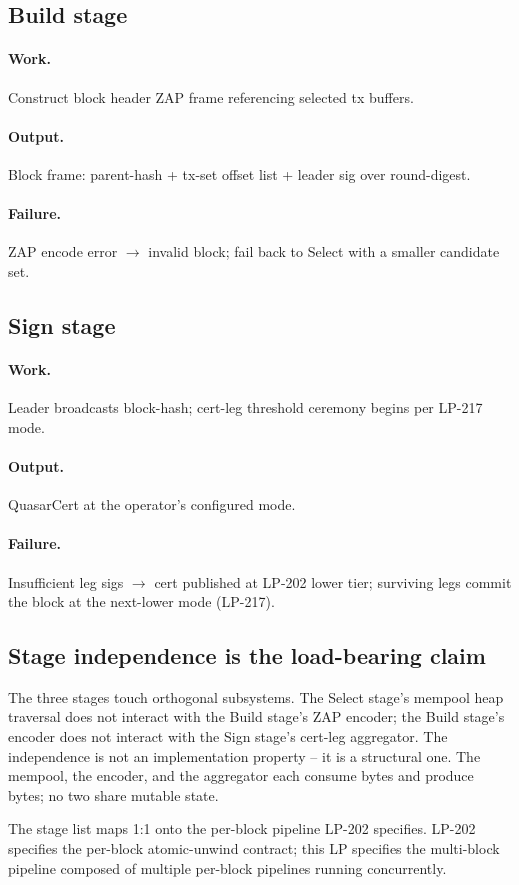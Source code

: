 \subsection{Build stage}

\paragraph{Work.} Construct block header ZAP frame referencing
selected tx buffers.

\paragraph{Output.} Block frame: parent-hash + tx-set offset list +
leader sig over round-digest.

\paragraph{Failure.} ZAP encode error $\to$ invalid block; fail back
to Select with a smaller candidate set.

\subsection{Sign stage}

\paragraph{Work.} Leader broadcasts block-hash; cert-leg threshold
ceremony begins per LP-217 mode.

\paragraph{Output.} QuasarCert at the operator's configured mode.

\paragraph{Failure.} Insufficient leg sigs $\to$ cert published at
LP-202 lower tier; surviving legs commit the block at the
next-lower mode (LP-217).

\subsection{Stage independence is the load-bearing claim}

The three stages touch orthogonal subsystems. The Select stage's
mempool heap traversal does not interact with the Build stage's ZAP
encoder; the Build stage's encoder does not interact with the Sign
stage's cert-leg aggregator. The independence is not an
implementation property -- it is a structural one. The mempool, the
encoder, and the aggregator each consume bytes and produce bytes; no
two share mutable state.

The stage list maps 1:1 onto the per-block pipeline LP-202 specifies.
LP-202 specifies the per-block atomic-unwind contract; this LP
specifies the multi-block pipeline composed of multiple per-block
pipelines running concurrently.
